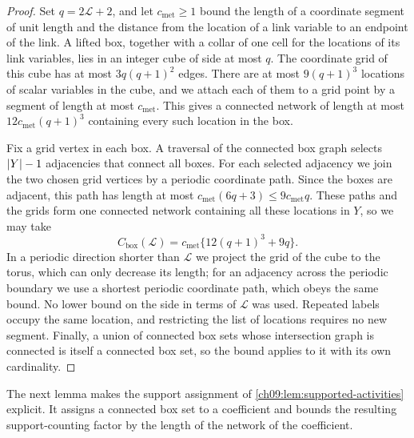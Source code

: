 \begin{proof}
Set $q=2\mathscr L+2$, and let $c_{\mathrm{met}}\ge1$ bound the length of a coordinate segment of unit length and the distance from the location of a link variable to an endpoint of the link. A lifted box, together with a collar of one cell for the locations of its link variables, lies in an integer cube of side at most $q$. The coordinate grid of this cube has at most $3q(q+1)^2$ edges. There are at most $9(q+1)^3$ locations of scalar variables in the cube, and we attach each of them to a grid point by a segment of length at most $c_{\mathrm{met}}$. This gives a connected network of length at most $12c_{\mathrm{met}}(q+1)^3$ containing every such location in the box.

Fix a grid vertex in each box. A traversal of the connected box graph selects $\lvert Y\rvert-1$ adjacencies that connect all boxes. For each selected adjacency we join the two chosen grid vertices by a periodic coordinate path. Since the boxes are adjacent, this path has length at most $c_{\mathrm{met}}(6q+3)\le9c_{\mathrm{met}}q$. These paths and the grids form one connected network containing all these locations in $Y$, so we may take
\[
 C_{\mathrm{box}}(\mathscr L)=c_{\mathrm{met}}\{12(q+1)^3+9q\}.
\]
In a periodic direction shorter than $\mathscr L$ we project the grid of the cube to the torus, which can only decrease its length; for an adjacency across the periodic boundary we use a shortest periodic coordinate path, which obeys the same bound. No lower bound on the side in terms of $\mathscr L$ was used. Repeated labels occupy the same location, and restricting the list of locations requires no new segment. Finally, a union of connected box sets whose intersection graph is connected is itself a connected box set, so the bound applies to it with its own cardinality.
\end{proof}

The next lemma makes the support assignment of \cref{ch09:lem:supported-activities} explicit. It assigns a connected box set to a coefficient and bounds the resulting support-counting factor by the length of the network of the coefficient.

